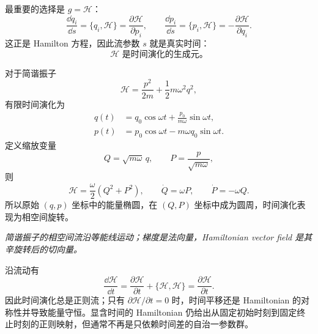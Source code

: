 最重要的选择是 $g=\mathcal H$：
\begin{equation}
  \frac{\dd q_i}{\dd s}=\{q_i,\mathcal H\}
  =\frac{\partial\mathcal H}{\partial p_i},
  \qquad
  \frac{\dd p_i}{\dd s}=\{p_i,\mathcal H\}
  =-\frac{\partial\mathcal H}{\partial q_i}.
  \label{eq:QM-C02-S08-h-generates-time}
\end{equation}
这正是 Hamilton 方程，因此流参数 $s$ 就是真实时间：
\begin{equation}
  \boxed{\mathcal H\text{ 是时间演化的生成元。}}
  \label{eq:QM-C02-S08-h-time-generator}
\end{equation}

对于简谐振子
\[
  \mathcal H=\frac{p^2}{2m}+\frac12m\omega^2q^2,
\]
有限时间演化为
\begin{align}
  q(t)&=q_0\cos\omega t+\frac{p_0}{m\omega}\sin\omega t,
  \label{eq:QM-C02-S08-oscillator-q}\\
  p(t)&=p_0\cos\omega t-m\omega q_0\sin\omega t.
  \label{eq:QM-C02-S08-oscillator-p}
\end{align}
定义缩放变量
\[
  Q=\sqrt{m\omega}\,q,
  \qquad
  P=\frac{p}{\sqrt{m\omega}},
\]
则
\[
  \mathcal H=\frac{\omega}{2}(Q^2+P^2),
  \qquad
  \dot Q=\omega P,
  \qquad
  \dot P=-\omega Q.
\]
所以原始 $(q,p)$ 坐标中的能量椭圆，在 $(Q,P)$ 坐标中成为圆周，时间演化表现为相空间旋转。

\begin{center}

\textit{简谐振子的相空间流沿等能线运动；梯度是法向量，Hamiltonian vector field 是其辛旋转后的切向量。}
\end{center}

沿流动有
\begin{equation}
  \frac{\dd\mathcal H}{\dd t}
  =\frac{\partial\mathcal H}{\partial t}
  +\{\mathcal H,\mathcal H\}
  =\frac{\partial\mathcal H}{\partial t}.
  \label{eq:QM-C02-S08-h-time-change}
\end{equation}
因此时间演化总是正则流；只有 $\partial\mathcal H/\partial t=0$ 时，时间平移还是 Hamiltonian 的对称性并导致能量守恒。显含时间的 Hamiltonian 仍给出从固定初始时刻到固定终止时刻的正则映射，但通常不再是只依赖时间差的自治一参数群。

